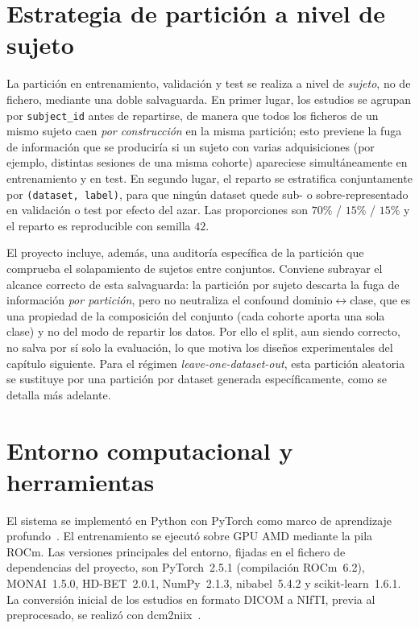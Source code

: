 \section{Estrategia de partición a nivel de sujeto}

La partición en entrenamiento, validación y test se realiza a nivel de
\emph{sujeto}, no de fichero, mediante una doble salvaguarda. En primer lugar,
los estudios se agrupan por \texttt{subject\_id} antes de repartirse, de manera
que todos los ficheros de un mismo sujeto caen \emph{por construcción} en la
misma partición; esto previene la fuga de información que se produciría si un
sujeto con varias adquisiciones (por ejemplo, distintas sesiones de una misma
cohorte) apareciese simultáneamente en entrenamiento y en test. En segundo
lugar, el reparto se estratifica conjuntamente por \texttt{(dataset, label)},
para que ningún dataset quede sub- o sobre-representado en validación o test por
efecto del azar. Las proporciones son $70\%$ / $15\%$ / $15\%$ y el reparto es
reproducible con semilla $42$.

El proyecto incluye, además, una auditoría específica de la partición que
comprueba el solapamiento de sujetos entre conjuntos. Conviene subrayar el
alcance correcto de esta salvaguarda: la partición por sujeto descarta la fuga
de información \emph{por partición}, pero no neutraliza el confound
dominio$\leftrightarrow$clase, que es una propiedad de la composición del conjunto (cada cohorte
aporta una sola clase) y no del modo de repartir los datos. Por ello el split,
aun siendo correcto, no salva por sí solo la evaluación, lo que motiva los
diseños experimentales del capítulo siguiente. Para el régimen
\emph{leave-one-dataset-out}, esta partición aleatoria se sustituye por una
partición por dataset generada específicamente, como se detalla más adelante.

\section{Entorno computacional y herramientas}

El sistema se implementó en Python con PyTorch como marco de aprendizaje
profundo~\cite{paszke2019pytorch}. El entrenamiento se ejecutó sobre GPU AMD
mediante la pila ROCm. Las versiones principales del entorno, fijadas en el
fichero de dependencias del proyecto, son PyTorch~2.5.1 (compilación
ROCm~6.2), MONAI~1.5.0, HD-BET~2.0.1, NumPy~2.1.3, nibabel~5.4.2 y
scikit-learn~1.6.1. La conversión inicial de los estudios en formato DICOM a
NIfTI, previa al preprocesado, se realizó con dcm2niix~\cite{li2016dcm2niix}.

